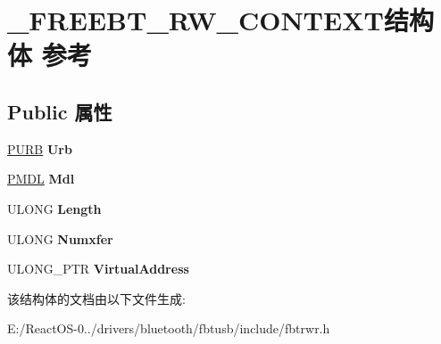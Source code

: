 \hypertarget{struct___f_r_e_e_b_t___r_w___c_o_n_t_e_x_t}{}\section{\+\_\+\+F\+R\+E\+E\+B\+T\+\_\+\+R\+W\+\_\+\+C\+O\+N\+T\+E\+X\+T结构体 参考}
\label{struct___f_r_e_e_b_t___r_w___c_o_n_t_e_x_t}
\subsection*{Public 属性}
\begin{DoxyCompactItemize}
\item 
\mbox{\label{struct___f_r_e_e_b_t___r_w___c_o_n_t_e_x_t_a1519cb26205bc659249b4a172f0ccf64}} 
\hyperlink{struct___u_r_b}{P\+U\+RB} {\bfseries Urb}
\item 
\mbox{\label{struct___f_r_e_e_b_t___r_w___c_o_n_t_e_x_t_a4358f2f8b639972e8c5b2d29e40da4f1}} 
\hyperlink{interfacevoid}{P\+M\+DL} {\bfseries Mdl}
\item 
\mbox{\label{struct___f_r_e_e_b_t___r_w___c_o_n_t_e_x_t_a7de21d181b3ace1ca61c6d8d932b2435}} 
U\+L\+O\+NG {\bfseries Length}
\item 
\mbox{\label{struct___f_r_e_e_b_t___r_w___c_o_n_t_e_x_t_a48f6dabc44be5789ba8ec1a81a4d20c9}} 
U\+L\+O\+NG {\bfseries Numxfer}
\item 
\mbox{\label{struct___f_r_e_e_b_t___r_w___c_o_n_t_e_x_t_a8f45fdfaa1e09d52c194122f5172928f}} 
U\+L\+O\+N\+G\+\_\+\+P\+TR {\bfseries Virtual\+Address}
\end{DoxyCompactItemize}


该结构体的文档由以下文件生成\+:\begin{DoxyCompactItemize}
\item 
E\+:/\+React\+O\+S-\/0../drivers/bluetooth/fbtusb/include/fbtrwr.\+h\end{DoxyCompactItemize}
